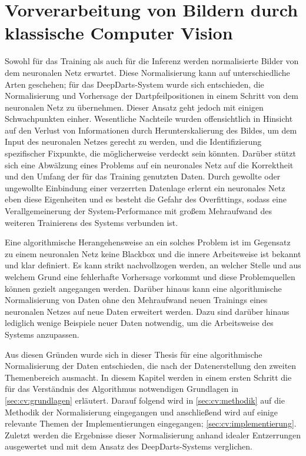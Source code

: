 
\chapter{Vorverarbeitung von Bildern durch klassische Computer Vision}
\label{cha:cv}

Sowohl für das Training als auch für die Inferenz werden normalisierte Bilder von dem neuronalen Netz erwartet. Diese Normalisierung kann auf unterschiedliche Arten geschehen; für das DeepDarts-System wurde sich entschieden, die Normalisierung und Vorhersage der Dartpfeilpositionen in einem Schritt von dem neuronalen Netz zu übernehmen. Dieser Ansatz geht jedoch mit einigen Schwachpunkten einher. Wesentliche Nachteile wurden offensichtlich in Hinsicht auf den Verlust von Informationen durch Herunterskalierung des Bildes, um dem Input des neuronalen Netzes gerecht zu werden, und die Identifizierung spezifischer Fixpunkte, die möglicherweise verdeckt sein könnten. Darüber stützt sich eine Abwälzung eines Problems auf ein neuronales Netz auf die Korrektheit und den Umfang der für das Training genutzten Daten. Durch gewollte oder ungewollte Einbindung einer verzerrten Datenlage erlernt ein neuronales Netz eben diese Eigenheiten und es besteht die Gefahr des Overfittings, sodass eine Verallgemeinerung der System-Performance mit großem Mehraufwand des weiteren Trainierens des Systems verbunden ist.

Eine algorithmische Herangehensweise an ein solches Problem ist im Gegensatz zu einem neuronalen Netz keine Blackbox und die innere Arbeitsweise ist bekannt und klar definiert. Es kann strikt nachvollzogen werden, an welcher Stelle und aus welchem Grund eine fehlerhafte Vorhersage vorkommt und diese Problemquellen können gezielt angegangen werden. Darüber hinaus kann eine algorithmische Normalisierung von Daten ohne den Mehraufwand neuen Trainings eines neuronalen Netzes auf neue Daten erweitert werden. Dazu sind darüber hinaus lediglich wenige Beispiele neuer Daten notwendig, um die Arbeitsweise des Systems anzupassen.

Aus diesen Gründen wurde sich in dieser Thesis für eine algorithmische Normalisierung der Daten entschieden, die nach der Datenerstellung den zweiten Themenbereich ausmacht. In diesem Kapitel werden in einem ersten Schritt die für das Verständnis des Algorithmus notwendigen Grundlagen in \autoref{sec:cv:grundlagen} erläutert. Darauf folgend wird in \autoref{sec:cv:methodik} auf die Methodik der Normalisierung eingegangen und anschließend wird auf einige relevante Themen der Implementierungen eingegangen; \autoref{sec:cv:implementierung}. Zuletzt werden die Ergebnisse dieser Normalisierung anhand idealer Entzerrungen ausgewertet und mit dem Ansatz des DeepDarts-Systems verglichen.

